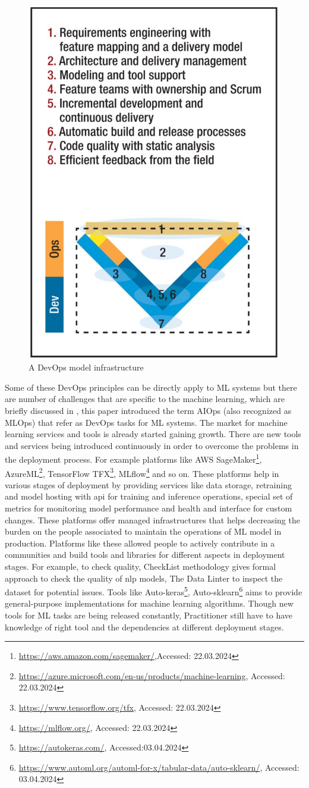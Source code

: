 \begin{figure}[hb]
    \centering
    \includegraphics[width=0.45 \textwidth]{chapters/images/Literature_review/DevOps.JPG}
    \caption{A DevOps model infrastructure \cite{ebert2016devops}}
    \label{fig:DevOps}
\end{figure}

Some of these DevOps principles can be directly apply to ML systems but there are number of challenges that are specific to the machine learning, which are briefly discussed in \cite{dang2019aiops}, this paper introduced the term AIOps (also recognized as MLOps) that refer as DevOps tasks for ML systems. The market for machine learning services and tools is already started gaining growth. There are new tools and services being introduced continuously in order to overcome the problems in the deployment process. For example platforms like AWS SageMaker\footnote{\url{https://aws.amazon.com/sagemaker/},Accessed: 22.03.2024}, AzureML\footnote{\url{ https://azure.microsoft.com/en-us/products/machine-learning}, Accessed: 22.03.2024}, TensorFlow TFX\footnote{\url{https://www.tensorflow.org/tfx}, Accessed: 22.03.2024}, MLflow\footnote{\url{https://mlflow.org/}, Accessed: 22.03.2024} and so on. These platforms help in various stages of deployment by providing services like data storage, retraining and model hosting with \acrfull{api} for training and inference operations, special set of metrics for monitoring model performance and health and interface for custom changes. These platforms offer managed infrastructures that helps decreasing the burden on the people associated to maintain the operations of ML model in production. Platforms like these allowed people to actively contribute in a communities and build tools and libraries for different aspects in deployment stages. For example, to check quality, CheckList methodology \cite{ribeiro2020beyond} gives formal approach to check the quality of \acrshort{nlp} models, The Data Linter \cite{hynes2017data} to inspect the dataset for potential issues. Tools like Auto-keras\footnote{\url{https://autokeras.com/}, Accessed:03.04.2024}, Auto-sklearn\footnote{\url{https://www.automl.org/automl-for-x/tabular-data/auto-sklearn/}, Accessed: 03.04.2024} aims to provide general-purpose implementations for machine learning algorithms. Though new tools for ML tasks are being released constantly, Practitioner still have to have knowledge of right tool and the dependencies at different deployment stages.




